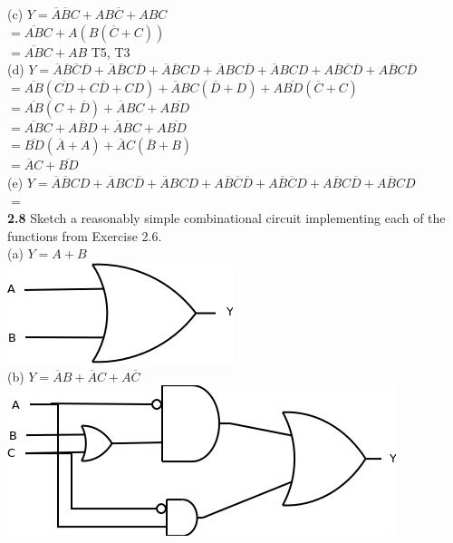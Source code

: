 \documentclass[12pt,a4paper]{report}
\newcommand*{\al}{\overline{A}}
\newcommand*{\bl}{\overline{B}}
\newcommand*{\cl}{\overline{C}}
\newcommand*{\dl}{\overline{D}}
\begin{document}
\begin{normalsize}
(c) $ Y = \overline{A}\overline{B}C + AB\overline{C} + ABC $ \\
$ = \overline{AB}C + A(B(\cl{}+C)) $ \\ 
$ = \overline{AB}C + AB $ T5, T3 \\

(d) $ Y = \overline{A}\overline{B}\overline{C}\overline{D} + \overline{A}\overline{B}C\overline{D} + \overline{A}\overline{B}CD + \overline{A}BC\overline{D} + \overline{A}BCD + A\overline{B}\overline{C}\overline{D} + A\overline{B}C\overline{D} $ \\
$ = \overline{AB}(\overline{CD} + C\dl{} + CD) + \al{}BC(\dl{} + D) + A\overline{BD}(\cl{} + C)$ \\
$ = \overline{AB}(C + \dl{}) + \al{}BC + A\overline{BD}  $ \\
$ = \overline{AB}C + \overline{ABD} + \al{}BC + A\overline{BD} $ \\
$ = \overline{BD}(\al{} + A) + \al{}C(\bl{} + B) $ \\
$ = \al{}C + \overline{BD} $ \\

(e) $ Y = \overline{A}\overline{B}CD + \overline{A}BC\overline{D} + \overline{A}BCD + A\overline{B}\overline{C}\overline{D} + A\overline{B}\overline{C}D + A\overline{B}C\overline{D} + A\overline{B}CD $ \\
$ = $ \\


\textbf{2.8} Sketch a reasonably simple combinational circuit implementing each of the functions from Exercise 2.6. \\
(a) $ Y = A + B $ \\
\includegraphics[scale=1]{2_8A} \\

(b) $ Y = \al{}B + \al{}C + A\cl{} $ \\
\includegraphics[scale=1]{2_8B} \\


\end{normalsize}
\end{document}
